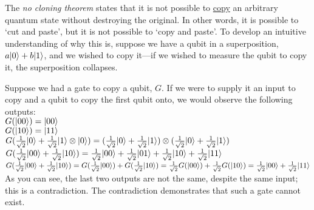 
\begin{definition}
    The \emph{no cloning theorem} states that it is not possible to \underline{copy} an arbitrary quantum state without destroying the original. In other words, it is possible to `cut and paste', but it is not possible to `copy and paste'. To develop an intuitive understanding of why this is, suppose we have a qubit in a superposition, $a \lvert0\rangle + b \lvert1\rangle$, and we wished to copy it---if we wished to measure the qubit to copy it, the superposition collapses.
\end{definition}

Suppose we had a gate to copy a qubit, $G$.
If we were to supply it an input to copy and a qubit to copy the first qubit onto, we would observe the following outputs:\\
$G(\lvert00\rangle) = \lvert00\rangle$\\
$G(\lvert10\rangle) = \lvert11\rangle$\\
$G(\frac{1}{\sqrt{2}} \lvert0\rangle + \frac{1}{\sqrt{2}} \lvert1\rangle \otimes \lvert0\rangle) = (\frac{1}{\sqrt{2}} \lvert0\rangle + \frac{1}{\sqrt{2}} \lvert1\rangle) \otimes (\frac{1}{\sqrt{2}} \lvert0\rangle + \frac{1}{\sqrt{2}} \lvert1\rangle)$\\
$G(\frac{1}{\sqrt{2}} \lvert00\rangle + \frac{1}{\sqrt{2}} \lvert10\rangle) = \frac{1}{\sqrt{2}} \lvert00\rangle + \frac{1}{\sqrt{2}} \lvert01\rangle + \frac{1}{\sqrt{2}} \lvert10\rangle + \frac{1}{\sqrt{2}} \lvert11\rangle$\\
$G(\frac{1}{\sqrt{2}} \lvert00\rangle + \frac{1}{\sqrt{2}} \lvert10\rangle) = G(\frac{1}{\sqrt{2}}\lvert00\rangle) + G(\frac{1}{\sqrt{2}}\lvert10\rangle) = \frac{1}{\sqrt{2}} G(\lvert00\rangle) + \frac{1}{\sqrt{2}} G(\lvert10\rangle) = \frac{1}{\sqrt{2}} \lvert00\rangle + \frac{1}{\sqrt{2}} \lvert11\rangle$\\
As you can see, the last two outputs are not the same, despite the same input; this is a contradiction. The contradiction demonstrates that such a gate cannot exist.
